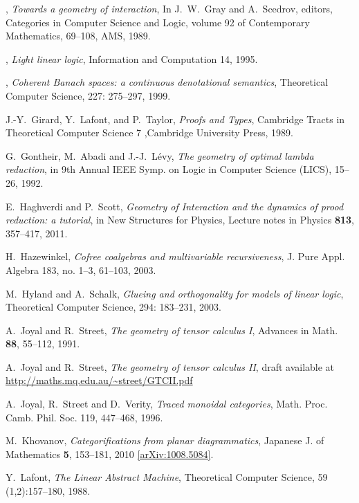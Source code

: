 \documentclass[english,letter paper,12pt,reqno]{article}
\theoremstyle{example}
\numberwithin{equation}{section}
\begin{document}
\begin{thebibliography}{BHLS03}
\bysame, \textsl{Towards a geometry of interaction}, In J.~W.~Gray and A.~Scedrov, editors, Categories in Computer Science and Logic, volume 92 of Contemporary Mathematics, 69--108, AMS, 1989.

\bysame, \textsl{Light linear logic}, Information and Computation 14, 1995.

\bysame, \textsl{Coherent {B}anach spaces: a continuous denotational semantics}, Theoretical Computer Science, 227: 275--297, 1999.

J.-Y.~Girard, Y.~Lafont, and P.~Taylor, \textsl{Proofs and Types}, Cambridge Tracts in Theoretical Computer Science 7 ,Cambridge University Press, 1989.

G.~Gontheir, M.~Abadi and J.-J.~L\'{e}vy, \textsl{The geometry of optimal lambda reduction}, in 9th Annual IEEE Symp. on Logic in Computer Science (LICS), 15--26, 1992.
  
E.~Haghverdi and P.~Scott, \textsl{Geometry of {I}nteraction and the dynamics of prood reduction: a tutorial}, in New Structures for Physics, Lecture notes in Physics \textbf{813}, 357--417, 2011.
  
H.~Hazewinkel, \textsl{Cofree coalgebras and multivariable recursiveness}, J. Pure Appl. Algebra 183, no. 1--3, 61--103, 2003.

M.~Hyland and A.~Schalk, \textsl{Glueing and orthogonality for models of linear logic}, Theoretical Computer Science, 294: 183--231, 2003.

A.~Joyal and R.~Street, \textsl{The geometry of tensor calculus I}, Advances in Math. \textbf{88}, 55--112, 1991.

A.~Joyal and R.~Street, \textsl{The geometry of tensor calculus II}, 
draft available at 
\href{http://maths.mq.edu.au/~street/GTCII.pdf}{http://maths.mq.edu.au/\textasciitilde street/GTCII.pdf}

A.~Joyal, R.~Street and D.~Verity, \textsl{Traced monoidal categories}, Math. Proc. Camb. Phil. Soc. 119, 447--468, 1996.

M.~Khovanov, \textsl{Categorifications from planar diagrammatics}, Japanese J. of Mathematics \textbf{5}, 153--181, 2010 \href{http://arxiv.org/abs/1008.5084}{[arXiv:1008.5084]}.
  
Y.~Lafont, \textsl{The {L}inear {A}bstract {M}achine}, Theoretical Computer Science, 59 (1,2):157--180, 1988.


\end{thebibliography}
\end{document}
